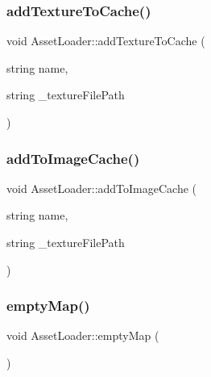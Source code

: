 \hypertarget{class_asset_loader_ae902ff7d59878412699ae1dd5e3b1fc0}{}\label{class_asset_loader_ae902ff7d59878412699ae1dd5e3b1fc0} 
\subsubsection{\texorpdfstring{add\+Texture\+To\+Cache()}{addTextureToCache()}}
{\footnotesize\ttfamily void Asset\+Loader\+::add\+Texture\+To\+Cache (\begin{DoxyParamCaption}\item[{string}]{name,  }\item[{string}]{\+\_\+texture\+File\+Path }\end{DoxyParamCaption})}

\hypertarget{class_asset_loader_a02a029329bac26f078cc8a8248b484ad}{}\label{class_asset_loader_a02a029329bac26f078cc8a8248b484ad} 
\subsubsection{\texorpdfstring{add\+To\+Image\+Cache()}{addToImageCache()}}
{\footnotesize\ttfamily void Asset\+Loader\+::add\+To\+Image\+Cache (\begin{DoxyParamCaption}\item[{string}]{name,  }\item[{string}]{\+\_\+texture\+File\+Path }\end{DoxyParamCaption})\hspace{0.3cm}{\ttfamily [protected]}}

\hypertarget{class_asset_loader_a682bc76f35e281e4f6cf3d7b19388bbb}{}\label{class_asset_loader_a682bc76f35e281e4f6cf3d7b19388bbb} 
\subsubsection{\texorpdfstring{empty\+Map()}{emptyMap()}}
{\footnotesize\ttfamily void Asset\+Loader\+::empty\+Map (\begin{DoxyParamCaption}{ }\end{DoxyParamCaption})}


